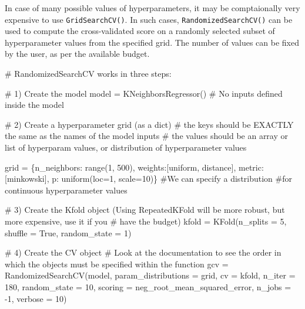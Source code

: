 \documentclass[
  letterpaper,
  DIV=11,
  numbers=noendperiod]{scrreprt}
\newenvironment{Shaded}{\begin{snugshade}}{\end{snugshade}}
\newcommand{\BuiltInTok}[1]{\textcolor[rgb]{0.00,0.23,0.31}{#1}}
\newcommand{\CommentTok}[1]{\textcolor[rgb]{0.37,0.37,0.37}{#1}}
\newcommand{\DecValTok}[1]{\textcolor[rgb]{0.68,0.00,0.00}{#1}}
\newcommand{\NormalTok}[1]{\textcolor[rgb]{0.00,0.23,0.31}{#1}}
\newcommand{\OperatorTok}[1]{\textcolor[rgb]{0.37,0.37,0.37}{#1}}
\newcommand{\StringTok}[1]{\textcolor[rgb]{0.13,0.47,0.30}{#1}}
\newcommand{\VariableTok}[1]{\textcolor[rgb]{0.07,0.07,0.07}{#1}}
\begin{document}
In case of many possible values of hyperparameters, it may be
comptaionally very expensive to use \texttt{GridSearchCV()}. In such
cases, \texttt{RandomizedSearchCV()} can be used to compute the
cross-validated score on a randomly selected subset of hyperparameter
values from the specified grid. The number of values can be fixed by the
user, as per the available budget.

\begin{Shaded}
\begin{Highlighting}[]
\CommentTok{\# RandomizedSearchCV works in three steps:}

\CommentTok{\# 1) Create the model}
\NormalTok{model }\OperatorTok{=}\NormalTok{ KNeighborsRegressor() }\CommentTok{\# No inputs defined inside the model}

\CommentTok{\# 2) Create a hyperparameter grid (as a dict)}
    \CommentTok{\# the keys should be EXACTLY the same as the names of the model inputs}
    \CommentTok{\# the values should be an array or list of hyperparam values, or distribution of hyperparameter values}
    
    
\NormalTok{grid }\OperatorTok{=}\NormalTok{ \{}\StringTok{\textquotesingle{}n\_neighbors\textquotesingle{}}\NormalTok{: }\BuiltInTok{range}\NormalTok{(}\DecValTok{1}\NormalTok{, }\DecValTok{500}\NormalTok{), }\StringTok{\textquotesingle{}weights\textquotesingle{}}\NormalTok{:[}\StringTok{\textquotesingle{}uniform\textquotesingle{}}\NormalTok{, }\StringTok{\textquotesingle{}distance\textquotesingle{}}\NormalTok{], }
        \StringTok{\textquotesingle{}metric\textquotesingle{}}\NormalTok{: [}\StringTok{\textquotesingle{}minkowski\textquotesingle{}}\NormalTok{], }\StringTok{\textquotesingle{}p\textquotesingle{}}\NormalTok{: uniform(loc}\OperatorTok{=}\DecValTok{1}\NormalTok{, scale}\OperatorTok{=}\DecValTok{10}\NormalTok{)\} }\CommentTok{\#We can specify a distribution }
                                                                \CommentTok{\#for continuous hyperparameter values}

\CommentTok{\# 3) Create the Kfold object (Using RepeatedKFold will be more robust, but more expensive, use it if you }
\CommentTok{\# have the budget)}
\NormalTok{kfold }\OperatorTok{=}\NormalTok{ KFold(n\_splits }\OperatorTok{=} \DecValTok{5}\NormalTok{, shuffle }\OperatorTok{=} \VariableTok{True}\NormalTok{, random\_state }\OperatorTok{=} \DecValTok{1}\NormalTok{)}

\CommentTok{\# 4) Create the CV object}
\CommentTok{\# Look at the documentation to see the order in which the objects must be specified within the function}
\NormalTok{gcv }\OperatorTok{=}\NormalTok{ RandomizedSearchCV(model, param\_distributions }\OperatorTok{=}\NormalTok{ grid, cv }\OperatorTok{=}\NormalTok{ kfold, n\_iter }\OperatorTok{=} \DecValTok{180}\NormalTok{, random\_state }\OperatorTok{=} \DecValTok{10}\NormalTok{,}
\NormalTok{                         scoring }\OperatorTok{=} \StringTok{\textquotesingle{}neg\_root\_mean\_squared\_error\textquotesingle{}}\NormalTok{, n\_jobs }\OperatorTok{=} \OperatorTok{{-}}\DecValTok{1}\NormalTok{, verbose }\OperatorTok{=} \DecValTok{10}\NormalTok{)}


\end{Highlighting}
\end{Shaded}
\end{document}
